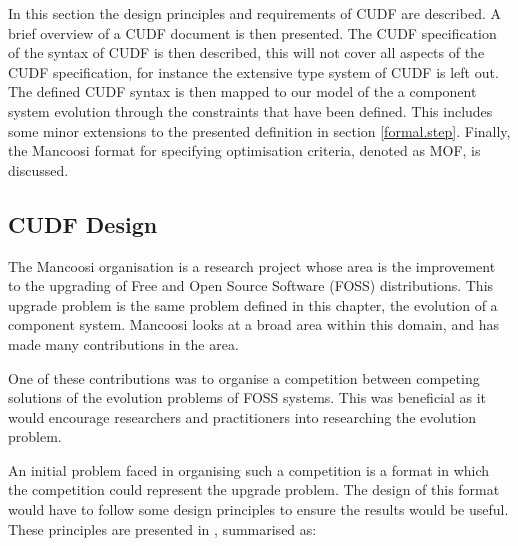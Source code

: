In this section the design principles and requirements of CUDF are described.
A brief overview of a CUDF document is then presented.
The CUDF specification of the syntax of CUDF is then described, this will not cover all aspects of the CUDF specification, for instance the extensive type system of CUDF is left out.
The defined CUDF syntax is then mapped to our model of the a component system evolution through the constraints that have been defined.
This includes some minor extensions to the presented definition in section \ref{formal.step}.
Finally, the Mancoosi format for specifying optimisation criteria, denoted as MOF, is discussed.

\subsection{CUDF Design}
The Mancoosi organisation is a research project whose area is the improvement to the upgrading of Free and Open Source Software (FOSS) distributions.
This upgrade problem is the same problem defined in this chapter, the evolution of a component system.
Mancoosi looks at a broad area within this domain, and has made many contributions in the area.

One of these contributions was to organise a competition between competing solutions of the evolution problems of FOSS systems.
This was beneficial as it would encourage researchers and practitioners into researching the evolution problem.

An initial problem faced in organising such a competition is a format in which the competition could represent the upgrade problem.
The design of this format would have to follow some design principles to ensure the results would be useful.
These principles are presented in \citep{treinen2009common}, summarised as:

